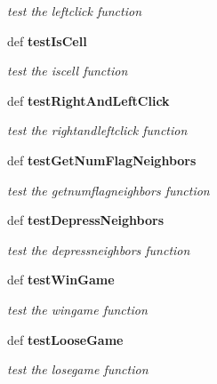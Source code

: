\begin{CompactItemize}
\begin{CompactList}\small\item\em test the leftclick function \item\end{CompactList}\item 
def \bf{test\-Is\-Cell}\label{classtestall_1_1BoardTest_cc7e2cece50ac9f72ec995dc54a167af}

\begin{CompactList}\small\item\em test the iscell function \item\end{CompactList}\item 
def \bf{test\-Right\-And\-Left\-Click}\label{classtestall_1_1BoardTest_df8d3495c70a7c1e214722ac82500c40}

\begin{CompactList}\small\item\em test the rightandleftclick function \item\end{CompactList}\item 
def \bf{test\-Get\-Num\-Flag\-Neighbors}\label{classtestall_1_1BoardTest_91fa66a9abb4d3a0ccc989e5b048fd53}

\begin{CompactList}\small\item\em test the getnumflagneighbors function \item\end{CompactList}\item 
def \bf{test\-Depress\-Neighbors}\label{classtestall_1_1BoardTest_165db5688d58dbc68f69fd88910620ed}

\begin{CompactList}\small\item\em test the depressneighbors function \item\end{CompactList}\item 
def \bf{test\-Win\-Game}\label{classtestall_1_1BoardTest_3a515cbfe5a5f2d184a96442c0aa9dc4}

\begin{CompactList}\small\item\em test the wingame function \item\end{CompactList}\item 
def \bf{test\-Loose\-Game}\label{classtestall_1_1BoardTest_03c38869d7731ca09ee5eb0c32c88be6}

\begin{CompactList}\small\item\em test the losegame function \item\end{CompactList}\end{CompactItemize}
